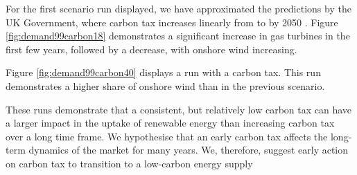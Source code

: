 

For the first scenario run displayed, we have approximated the predictions by the UK Government, where carbon tax increases linearly from  to  by 2050 \cite{Department2016}. Figure \ref{fig:demand99carbon18} demonstrates a significant increase in gas turbines in the first few years, followed by a decrease, with onshore wind increasing.

Figure \ref{fig:demand99carbon40} displays a run with a  carbon tax. This run demonstrates a higher share of onshore wind than in the previous scenario. 

These runs demonstrate that a consistent, but relatively low carbon tax can have a larger impact in the uptake of renewable energy than increasing carbon tax over a long time frame. We hypothesise that an early carbon tax affects the long-term dynamics of the market for many years. We, therefore, suggest early action on carbon tax to transition to a low-carbon energy supply


%


